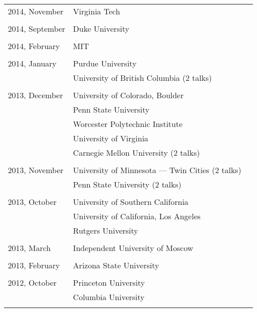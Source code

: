 \documentclass[letterpaper,11pt]{article}
\begin{document}
\begin{longtable}{llc}

  2014, November
  & Virginia Tech\\\\

  2014, September
  & Duke University\\\\

  2014, February
  & MIT\\\\

  2014, January 
  & Purdue University &\hspace{110pt}
  \\& University of British Columbia (2 talks)\\\\
  
  2013, December
  & University of Colorado, Boulder
  \\&Penn State University\\&Worcester Polytechnic Institute
  \\&University of Virginia\\&
  Carnegie Mellon University (2 talks)\\\\
  
  2013, November&
  University of Minnesota --- Twin Cities (2 talks)\\&
  Penn State University (2 talks)\\\\

  2013, October&
  University of Southern California 
  \\&
  University of California, Los Angeles
  \\&Rutgers University\\\\
  
  2013, March& Independent University of Moscow\\\\

  2013, February & Arizona State University\\\\

  2012, October & Princeton University \\
  & Columbia University\\\\


\end{longtable}
\end{document}
